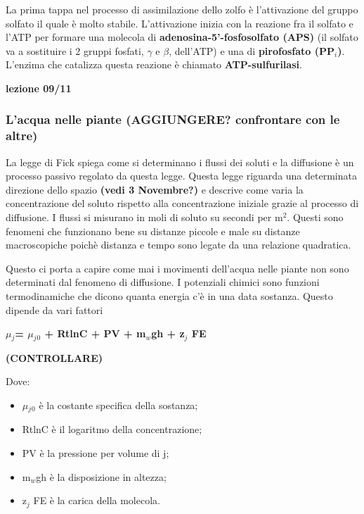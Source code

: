 \documentclass[]{article}
\begin{document}
La prima tappa nel processo di assimilazione dello zolfo è l'attivazione
del gruppo solfato il quale è molto stabile. L'attivazione inizia con la
reazione fra il solfato e l'ATP per formare una molecola di
\textbf{adenosina-5'-fosfosolfato (APS)} (il solfato va a sostituire i 2
gruppi fosfati, $\gamma$ e $\beta$, dell'ATP) e una di
\textbf{pirofosfato (PP$_i$)}. L'enzima che catalizza questa reazione è
chiamato \textbf{ATP-sulfurilasi}.

\textbf{lezione 09/11}

\subsubsection{L'acqua nelle piante (AGGIUNGERE? confrontare con le
altre)}\label{lacqua-nelle-piante-aggiungere-confrontare-con-le-altre}

La legge di Fick spiega come si determinano i flussi dei soluti e la
diffusione è un processo passivo regolato da questa legge. Questa legge
riguarda una determinata direzione dello spazio \textbf{(vedi 3
Novembre?)} e descrive come varia la concentrazione del soluto rispetto
alla concentrazione iniziale grazie al processo di diffusione. I flussi
si misurano in moli di soluto su secondi per m$^2$. Questi sono fenomeni
che funzionano bene su distanze piccole e male su distanze macroscopiche
poichè distanza e tempo sono legate da una relazione quadratica.

Questo ci porta a capire come mai i movimenti dell'acqua nelle piante
non sono determinati dal fenomeno di diffusione. I potenziali chimici
sono funzioni termodinamiche che dicono quanta energia c'è in una data
sostanza. Questo dipende da vari fattori

\textbf{$\mu$$_j$= $\mu$$_j$$_0$ + RtlnC + PV + m$_w$gh + z$_j$ FE}

\textbf{(CONTROLLARE)}

Dove:

\begin{itemize}
\itemsep1pt\parskip0pt
\item
  $\mu$$_j$$_0$ è la costante specifica della sostanza;
\item
  RtlnC è il logaritmo della concentrazione;
\item
  PV è la pressione per volume di j;
\item
  m$_w$gh è la disposizione in altezza;
\item
  z$_j$ FE è la carica della molecola.
\end{itemize}
\end{document}
